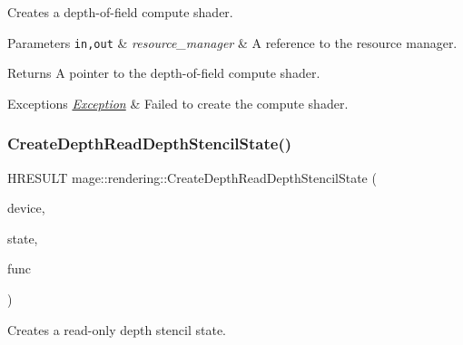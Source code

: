 Creates a depth-\/of-\/field compute shader.


\begin{DoxyParams}[1]{Parameters}
\mbox{\tt in,out}  & {\em resource\+\_\+manager} & A reference to the resource manager. \\
\hline
\end{DoxyParams}
\begin{DoxyReturn}{Returns}
A pointer to the depth-\/of-\/field compute shader. 
\end{DoxyReturn}

\begin{DoxyExceptions}{Exceptions}
{\em \mbox{\hyperlink{classmage_1_1_exception}{Exception}}} & Failed to create the compute shader. \\
\hline
\end{DoxyExceptions}
\mbox{\label{namespacemage_1_1rendering_ae95b42c9a5b31ea08e13b654e0b50742}} 
\subsubsection{\texorpdfstring{Create\+Depth\+Read\+Depth\+Stencil\+State()}{CreateDepthReadDepthStencilState()}}
{\footnotesize\ttfamily H\+R\+E\+S\+U\+LT mage\+::rendering\+::\+Create\+Depth\+Read\+Depth\+Stencil\+State (\begin{DoxyParamCaption}\item[{I\+D3\+D11\+Device \&}]{device,  }\item[{\mbox{\hyperlink{namespacemage_a8769f9d670d6b585ea306cb1062af94b}{Not\+Null}}$<$ I\+D3\+D11\+Depth\+Stencil\+State $\ast$$\ast$$>$}]{state,  }\item[{D3\+D11\+\_\+\+C\+O\+M\+P\+A\+R\+I\+S\+O\+N\+\_\+\+F\+U\+NC}]{func }\end{DoxyParamCaption})\hspace{0.3cm}{\ttfamily [noexcept]}}

Creates a read-\/only depth stencil state.


